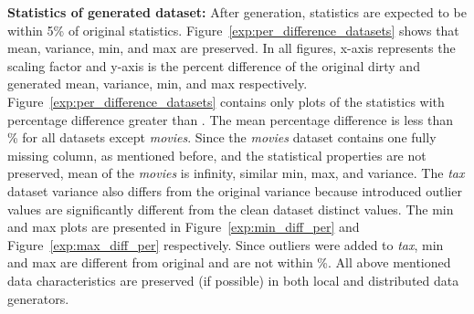\textbf{Statistics of generated dataset:} 
After generation, statistics are expected to be within 5\% of original statistics.
Figure~\ref{exp:per_difference_datasets} shows that mean, variance, min, and max are preserved.
In all figures, x-axis represents the scaling factor and y-axis is the percent difference of the original dirty and generated mean, variance, min, and max respectively.
Figure~\ref{exp:per_difference_datasets} contains only plots of the statistics with percentage difference greater than .
The mean percentage difference is less than \% for all datasets except \textit{movies}.
Since the \textit{movies} dataset contains one fully missing column, as mentioned before, and the statistical properties are not preserved, mean of the \textit{movies} is infinity, similar min, max, and variance.
The \textit{tax} dataset variance also differs from the original variance because introduced outlier values are significantly different from the clean dataset distinct values.
The min and max plots are presented in Figure~\ref{exp:min_diff_per} and Figure~\ref{exp:max_diff_per} respectively.
Since outliers were added to \textit{tax}, min and max are different from original and are not within \%.
All above mentioned data characteristics are preserved (if possible) in both local and distributed data generators.
